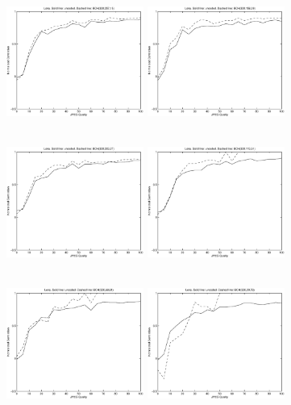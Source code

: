 \documentclass[12pt]{article}
\begin{document}
\begin{figure}[p]
	\includegraphics[height=4.5cm,width=4.5cm]{xieplot3.eps}
	\includegraphics[height=4.5cm,width=4.5cm]{xieplot5.eps}
	\includegraphics[height=4.5cm,width=4.5cm]{xieplot7.eps}
	\includegraphics[height=4.5cm,width=4.5cm]{xieplot9.eps}
	\includegraphics[height=4.5cm,width=4.5cm]{xieplot11.eps}
	\includegraphics[height=4.5cm,width=4.5cm]{xieplot13.eps}
	

\end{figure}
\end{document}
